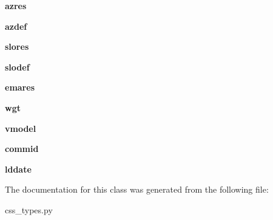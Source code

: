 \begin{DoxyCompactItemize}
\item 
\hypertarget{classcss__types_1_1assoc30_add17093e790de3de5c55e9aeebed3833}{}{\bfseries azres}\label{classcss__types_1_1assoc30_add17093e790de3de5c55e9aeebed3833}

\item 
\hypertarget{classcss__types_1_1assoc30_a5c1712127449c30af85cc7eaca22503a}{}{\bfseries azdef}\label{classcss__types_1_1assoc30_a5c1712127449c30af85cc7eaca22503a}

\item 
\hypertarget{classcss__types_1_1assoc30_a9dc57539bc088ad6ca9672fed76d1763}{}{\bfseries slores}\label{classcss__types_1_1assoc30_a9dc57539bc088ad6ca9672fed76d1763}

\item 
\hypertarget{classcss__types_1_1assoc30_a5ca5e608ac40c87fefc262b4d225aa81}{}{\bfseries slodef}\label{classcss__types_1_1assoc30_a5ca5e608ac40c87fefc262b4d225aa81}

\item 
\hypertarget{classcss__types_1_1assoc30_aacb21ba29265a5c6aa5838e820d26ac4}{}{\bfseries emares}\label{classcss__types_1_1assoc30_aacb21ba29265a5c6aa5838e820d26ac4}

\item 
\hypertarget{classcss__types_1_1assoc30_a3955423b02924e8020875587a5574b9f}{}{\bfseries wgt}\label{classcss__types_1_1assoc30_a3955423b02924e8020875587a5574b9f}

\item 
\hypertarget{classcss__types_1_1assoc30_aae57cb3f75816c2bb9a94178954d04f9}{}{\bfseries vmodel}\label{classcss__types_1_1assoc30_aae57cb3f75816c2bb9a94178954d04f9}

\item 
\hypertarget{classcss__types_1_1assoc30_a71a2fd2dccbb2ee1e5bf62dc5b96c08c}{}{\bfseries commid}\label{classcss__types_1_1assoc30_a71a2fd2dccbb2ee1e5bf62dc5b96c08c}

\item 
\hypertarget{classcss__types_1_1assoc30_a136a125dcb48b42d7362cbf35ba9305f}{}{\bfseries lddate}\label{classcss__types_1_1assoc30_a136a125dcb48b42d7362cbf35ba9305f}

\end{DoxyCompactItemize}


The documentation for this class was generated from the following file\+:\begin{DoxyCompactItemize}
\item 
css\+\_\+types.\+py\end{DoxyCompactItemize}
